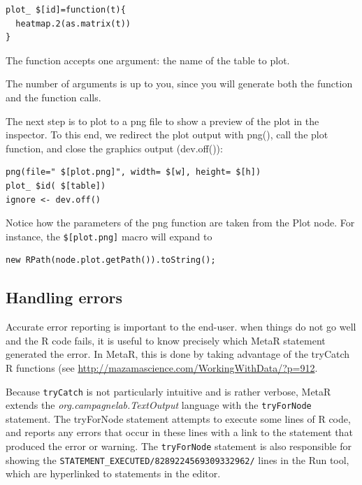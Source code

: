 \begin{lstlisting}
plot_ $[id]=function(t){                        
  heatmap.2(as.matrix(t)) 
}                                             
\end{lstlisting}

The function accepts one argument: the name of the table to plot. 

\begin{remark}
The number of arguments is up to you, since you will generate both the function and the function calls.

\end{remark}

The next step is to plot to a png file to show a preview of the plot in the inspector. To this end, we redirect the plot output with png(), call the plot function, and close the graphics output (dev.off()):

\begin{lstlisting}
png(file=" $[plot.png]", width= $[w], height= $[h])
plot_ $id( $[table])                           
ignore <- dev.off()                          
\end{lstlisting}
Notice how the parameters of the png function are taken from the Plot node.
For instance, the \texttt{\$[plot.png]} macro will expand to 

\begin{lstlisting}
new RPath(node.plot.getPath()).toString();
\end{lstlisting}


\subsection{Handling errors}
Accurate error reporting is important to the end-user. when things do not go well and the R code fails, it is useful to know precisely which MetaR statement generated the error. In MetaR, this is done by taking advantage of the tryCatch R functions (see \url{http://mazamascience.com/WorkingWithData/?p=912}. 

Because \texttt{tryCatch} is not particularly intuitive and is rather verbose, MetaR extends the \textit{org.campagnelab.TextOutput} language with the \texttt{tryForNode} statement. The tryForNode statement attempts to execute some lines of R code, and reports any errors that occur in these lines with a link to the statement that produced the error or warning. The \texttt{tryForNode} statement is also responsible for showing the \texttt{STATEMENT\_EXECUTED/8289224569309332962/} lines in the Run tool, which are hyperlinked to statements in the editor. 

